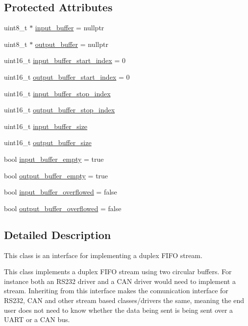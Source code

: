 \subsection*{Protected Attributes}
\begin{DoxyCompactItemize}
\item 
uint8\-\_\-t $\ast$ \hyperlink{class_stream_a81139fc126566f9d42470fdb405ed26a}{input\-\_\-buffer} = nullptr
\item 
uint8\-\_\-t $\ast$ \hyperlink{class_stream_a3cd072a10ad5c1b6308dd2da2cdbec71}{output\-\_\-buffer} = nullptr
\item 
uint16\-\_\-t \hyperlink{class_stream_a6fc009e9e71fa92cbbf9b407ede82a73}{input\-\_\-buffer\-\_\-start\-\_\-index} = 0
\item 
uint16\-\_\-t \hyperlink{class_stream_a1b2d63accede402e5c4c7fd3747d4c33}{output\-\_\-buffer\-\_\-start\-\_\-index} = 0
\item 
uint16\-\_\-t \hyperlink{class_stream_aaceece6a2defd1f7d9667fcc0be03a7a}{input\-\_\-buffer\-\_\-stop\-\_\-index}
\item 
uint16\-\_\-t \hyperlink{class_stream_a39d177eedd4d5ff28a95cca9131daf4c}{output\-\_\-buffer\-\_\-stop\-\_\-index}
\item 
uint16\-\_\-t \hyperlink{class_stream_a7373b1d6580a2d5dc74e788b3bb6a596}{input\-\_\-buffer\-\_\-size}
\item 
uint16\-\_\-t \hyperlink{class_stream_a0e9fd6570bafb97ab76ebd37158e78ff}{output\-\_\-buffer\-\_\-size}
\item 
bool \hyperlink{class_stream_aff1c899af0d2dea35700d5665f378cd8}{input\-\_\-buffer\-\_\-empty} = true
\item 
bool \hyperlink{class_stream_a54b21caaee0001e44968fb70d0a591f5}{output\-\_\-buffer\-\_\-empty} = true
\item 
bool \hyperlink{class_stream_ae7300cb8941cec142c14e8fc9baab9d3}{input\-\_\-buffer\-\_\-overflowed} = false
\item 
bool \hyperlink{class_stream_a149776fead5c56894699da5bfe489b65}{output\-\_\-buffer\-\_\-overflowed} = false
\end{DoxyCompactItemize}


\subsection{Detailed Description}
This class is an interface for implementing a duplex F\-I\-F\-O stream.

This class implements a duplex F\-I\-F\-O stream using two circular buffers. For instance both an R\-S232 driver and a C\-A\-N driver would need to implement a stream. Inheriting from this interface makes the comunication interface for R\-S232, C\-A\-N and other stream based classes/drivers the same, meaning the end user does not need to know whether the data being sent is being sent over a U\-A\-R\-T or a C\-A\-N bus.

